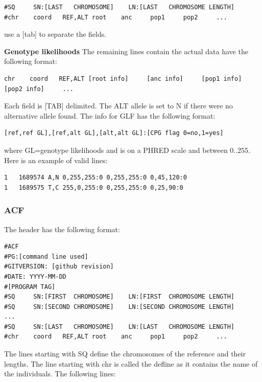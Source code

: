 \documentclass[a4paper]{article}
\begin{document}
\begin{lstlisting}
#SQ     SN:[LAST   CHROMOSOME]    LN:[LAST   CHROMOSOME LENGTH]
#chr    coord   REF,ALT root    anc     pop1     pop2     ...
\end{lstlisting}

\noindent use a [tab] to separate the fields. 

\noindent \textbf{Genotype likelihoods}
\noindent The remaining lines contain the actual data have the following format:

\begin{lstlisting}
chr    coord   REF,ALT [root info]     [anc info]     [pop1 info]     [pop2 info]     ...
\end{lstlisting}

\noindent  Each field is [TAB] delimited. The ALT allele is set to N if there were no alternative allele found. The info for GLF has the following format:

\begin{lstlisting}
[ref,ref GL],[ref,alt GL],[alt,alt GL]:[CPG flag 0=no,1=yes]
\end{lstlisting}

\noindent where GL=genotype likelihoods and is on a PHRED scale and between 0..255. Here is an example of valid lines:

\begin{lstlisting}
1	1689574	A,N	0,255,255:0	0,255,255:0	0,45,120:0
1	1689575	T,C	255,0,255:0	0,255,255:0	0,25,90:0
\end{lstlisting}

\subsubsection{ACF} 

\label{text:acf}
\noindent The header has the following format:

\begin{lstlisting}
#ACF
#PG:[command line used]
#GITVERSION: [github revision]
#DATE: YYYY-MM-DD
#[PROGRAM TAG]
#SQ     SN:[FIRST  CHROMOSOME]    LN:[FIRST  CHROMOSOME LENGTH]
#SQ     SN:[SECOND CHROMOSOME]    LN:[SECOND CHROMOSOME LENGTH]
...
#SQ     SN:[LAST   CHROMOSOME]    LN:[LAST   CHROMOSOME LENGTH]
#chr    coord   REF,ALT root    anc     pop1     pop2     ...
\end{lstlisting}


\noindent The lines starting with  SQ define the chromosomes of the reference and their lengths. The line starting with chr is called the defline as it contains the name of the individuals. The following lines:
\end{document}
